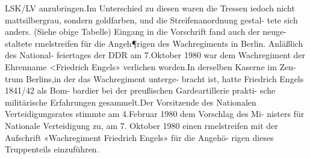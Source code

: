 LSK/LV anzubringen.Im Unterschied zu diesen
waren die Tressen iedoch nicht mattsilbergrau, sondern goldfarben, und die Streifenanordnung gestal-
tete sich anders. (Siehe obige Tabelle)
Eingang in die Vorschrift fand auch der neuge-
staltete rmelstreifen für die Angeh¶rigen des
Wachregiments in Berlin. Anläßlich des National-
feiertages der DDR am 7.Oktober 1980 war dem
Wachregiment der Ehrenname <Friedrich Engels»
verlichen worden.In derselben Kaserne im Zen-
trum Berlins,in der das Wachregiment unterge-
bracht ist, hatte Friedrich Engels 1841/42 als Bom-
bardier bei der preußischen Gardeartillerie prakti-
sche militärische Erfahrungen gesammelt.Der
Vorsitzende des Nationalen Verteidigungsrates
stimmte am 4.Februar 1980 dem Vorschlag des Mi-
nisters für Nationale Verteidigung zu, am 7. Oktober 1980 einen rmelstreifen mit der Aufschrift
«Wachregiment Friedrich Engels» für die Angehö-
rigen dieses Truppenteils einzuführen.